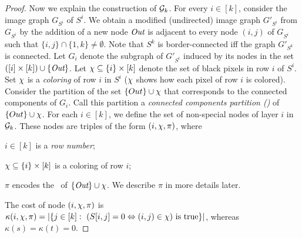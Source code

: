 \documentclass[11pt,english]{article}
\renewenvironment{itemize}[1]{\begin{compactitem}#1}{\end{compactitem}}
\numberwithin{figure}{section}
\begin{document}
\begin{proof}
Now we explain the construction of ${\mathcal G}_k$. For every $i\in[k]$, consider the image graph $G_{S^i}$ of $S^i$. We obtain a modified (undirected) image graph $G'_{S^i}$ from $G_{S^i}$ by the addition of a new node $\mbox{\it Out}$ is adjacent to every node $(i,j)$ of $G_{S^i}$ such that $\{i,j\}\cap\{1,k\}\not=\emptyset$. Note that $S^k$ is border-connected iff the graph $G'_{S^k}$ is connected. Let $G_i$ denote the subgraph of $G'_{S^i}$ induced by its nodes in the set $([i]\times[k])\cup\{\mbox{\it Out}\}$. Let $\chi\subseteq\{i\}\times[k]$ denote the set of black pixels in row $i$ of $S^i$. Set $\chi$ is a {\em coloring} of row $i$ in $S^i$ ($\chi$ shows how each pixel of row $i$ is colored). Consider the partition of the set $\{Out\}\cup\chi$ that corresponds to the connected components of $G_i$. Call this partition a {\em connected components partition (\cc)} of $\{Out\}\cup\chi$. For each $i\in[k]$, we define the set of non-special nodes of layer $i$ in ${\mathcal G}_k$. These nodes are triples of the form $(i,\chi,\pi)$, where
\begin{itemize}
\item
$i\in[k]$ is a {\em row number};
\item
$\chi\subseteq \{i\}\times[k]$ is a coloring of row $i$;
\item
$\pi$ encodes the \cc\ of $\{\mbox{\it Out}\}\cup\chi$. We describe $\pi$ in more details later.
\end{itemize}

The cost of node $(i,\chi,\pi)$ is $\kappa(i,\chi,\pi)=|\{j\in[k]:~(S[i,j]=0\Leftrightarrow(i,j)\in\chi) \text{ is true}\}|$, whereas
$\kappa(s)=\kappa(t)=0$.



\end{proof}
\end{document}
